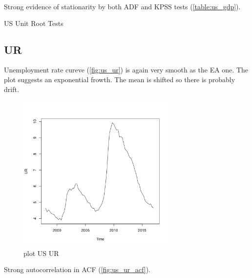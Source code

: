 \documentclass[10pt]{article}
\begin{document}
Strong evidence of stationarity by both ADF and KPSS tests (\autoref{table:us_gdp}).

\begin{table}[h!]
\centering
{}
\caption{ US Unit Root Tests}
\label{table:us_gdp}
\end{table}

\subsection{UR}

Unemployment rate cureve (\autoref{fig:us_ur}) is again very smooth as the EA one. The plot suggests an exponential frowth. The mean is shifted so there is probably drift. 

\begin{figure}[h!]
\centering
\includegraphics[width = 0.7\textwidth]{../plots/us_UR}
\caption{plot US UR}
\label{fig:us_ur}
\end{figure}

Strong autocorrelation in ACF (\autoref{fig:us_ur_acf}).
\end{document}
